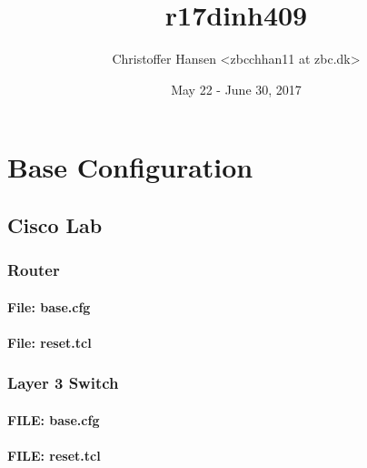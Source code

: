\documentclass[a4paper,12pt,twoside]{book}
\begin{document}
\title{r17dinh409}
\author{Christoffer Hansen <zbcchhan11 at zbc.dk>}
\date{May 22 - June 30, 2017}
\maketitle

\tableofcontents


\chapter{Base Configuration}

\section{Cisco Lab}


\subsection{Router}
\subsubsection{File: base.cfg}
%
\subsubsection{File: reset.tcl}
%

\newpage


\subsection{Layer 3 Switch}
\subsubsection{FILE: base.cfg}

\subsubsection{FILE: reset.tcl}

\end{document}
